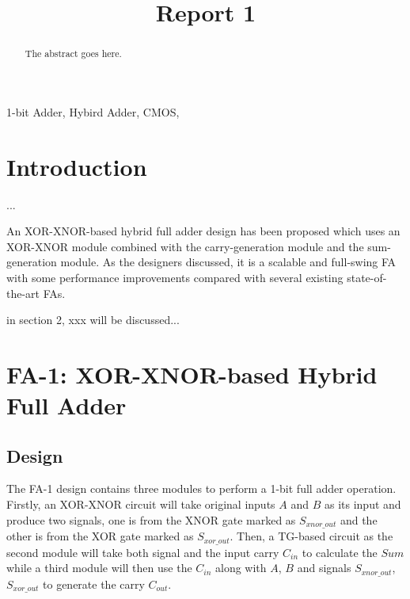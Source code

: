 \documentclass[conference]{IEEEtran}
\begin{document}
\title{Report 1}

\author{
}
\maketitle

\begin{abstract}
	The abstract goes here.
\end{abstract}

\begin{IEEEkeywords}
	1-bit Adder, Hybird Adder, CMOS,
\end{IEEEkeywords}

\section{Introduction}

...

An XOR-XNOR-based hybrid full adder design has been proposed\cite{20212210429416}
which uses an XOR-XNOR module combined with the carry-generation module and the sum-generation module.
As the designers discussed, it is a scalable and full-swing FA
with some performance improvements compared with several existing state-of-the-art FAs.

in section 2, xxx will be discussed...


\section{FA-1: XOR-XNOR-based Hybrid Full Adder}

\subsection{Design}

The FA-1\cite{20212210429416} design contains three modules to perform a 1-bit full adder operation.
Firstly, an XOR-XNOR circuit will take original inputs \(A\) and \(B\) as its input and produce two signals,
one is from the XNOR gate marked as \(S_{xnor\_out}\) and the other is from the XOR gate marked as \( S_{xor\_out}\).
Then, a TG-based circuit as the second module will take both signal and the input carry \(C_{in}\) to calculate the \(Sum\)
while a third module will then use the \(C_{in}\) along with \(A\), \(B\) and signals \(S_{xnor\_out}\), \( S_{xor\_out}\) to generate the carry \(C_{out}\).
\end{document}
